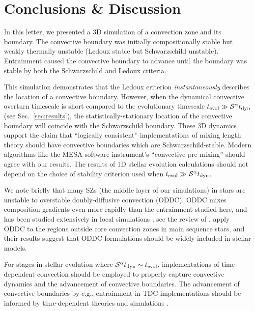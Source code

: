 \section{Conclusions \& Discussion}
\label{sec:conclusions}

In this letter, we presented a 3D simulation of a convection zone and its boundary.
The convective boundary was initially compositionally stable but weakly thermally unstable (Ledoux stable but Schwarzschild unstable).
Entrainment caused the convective boundary to advance until the boundary was stable by both the Schwarzschild and Ledoux criteria.

This simulation demonstrates that the Ledoux criterion \emph{instantaneously} describes the location of a convective boundary.
However, when the dynamical convective overturn timescale is short compared to the evolutionary timescale $t_{\rm{evol}} \gg \mathcal{S}^{\alpha} t_{\rm{dyn}}$ (see Sec.~\ref{sec:results}), the statistically-stationary location of the convective boundary will coincide with the Schwarzschild boundary.
These 3D dynamics support the claim that ``logically consistent'' implementations of mixing length theory \citep{gabriel_etal_2014, mesa4, mesa5} should have convective boundaries which are Schwarzschild-stable.
Modern algorithms like the MESA software instrument's ``convective pre-mixing'' \citep[CPM,][]{mesa5} should agree with our results.
The results of 1D stellar evolution calculations should not depend on the choice of stability criterion used when $t_{\rm{evol}} \gg \mathcal{S}^{\alpha} t_{\rm{dyn}}$.

We note briefly that many SZs (the middle layer of our simulations) in stars are unstable to overstable doubly-diffusive convection (ODDC).
ODDC mixes composition gradients even more rapidly than the entrainment studied here, and has been studied extensively in local simulations \citep{mirouh_etal_2012, wood_etal_2013, xie_etal_2017}; see the review of \citet{garaud_2018}.
\citet{moore_garaud_2016} apply ODDC to the regions outside core convection zones in main sequence stars, and their results suggest that ODDC formulations should be widely included in stellar models.

For stages in stellar evolution where $\mathcal{S}^{\alpha} t_{\rm{dyn}} \sim t_{\rm{evol}}$, implementations of time-dependent convection \citep[TDC,][]{tdc_1986} should be employed to properly capture convective dynamics and the advancement of convective boundaries.
The advancement of convective boundaries by e.g., entrainment in TDC implementations should be informed by time-dependent theories and simulations \citep[e.g.,][]{turner_1968, fuentes_cumming_2020}.


